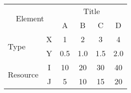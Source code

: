 \begin{table}
	\centering
	\label{tab:mixSpanning}
	\begin{tabular}{|cc|c|c|c|c|} %
		\hline %
		\multicolumn{2}{|c|}{\multirow{2}{*}{Element}} & \multicolumn{4}{c|}{Title} \\
        \cline{3-6} %
		\multicolumn{2}{|c|}{} & A & B & C & D \\
        \hline
		\multicolumn{1}{|l|}{\multirow{2}{*}{Type}} & X & 1 & 2 & 3 & 4 \\
        \cline{2-6}
		\multicolumn{1}{|l|}{} & Y & 0.5 & 1.0 & 1.5 & 2.0 \\
        \hline
		\multicolumn{1}{|l|}{\multirow{2}{*}{Resource}} & I & 10 & 20 & 30 & 40\\
        \cline{2-6}
		\multicolumn{1}{|l|}{} & J & 5 & 10 & 15 & 20 \\
        \hline
	\end{tabular}
\end{table}
